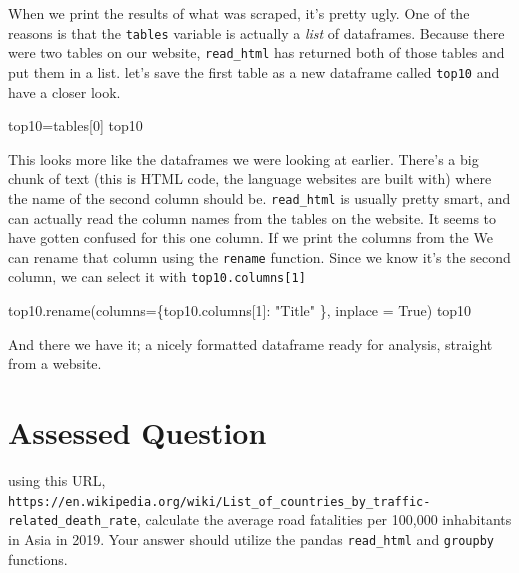 \documentclass[
  letterpaper,
  DIV=11,
  numbers=noendperiod]{scrreprt}
\newenvironment{Shaded}{\begin{snugshade}}{\end{snugshade}}
\newcommand{\DecValTok}[1]{\textcolor[rgb]{0.68,0.00,0.00}{#1}}
\newcommand{\NormalTok}[1]{\textcolor[rgb]{0.00,0.23,0.31}{#1}}
\newcommand{\OperatorTok}[1]{\textcolor[rgb]{0.37,0.37,0.37}{#1}}
\newcommand{\StringTok}[1]{\textcolor[rgb]{0.13,0.47,0.30}{#1}}
\newcommand{\VariableTok}[1]{\textcolor[rgb]{0.07,0.07,0.07}{#1}}
\begin{document}
When we print the results of what was scraped, it's pretty ugly. One of
the reasons is that the \texttt{tables} variable is actually a
\emph{list} of dataframes. Because there were two tables on our website,
\texttt{read\_html} has returned both of those tables and put them in a
list. let's save the first table as a new dataframe called
\texttt{top10} and have a closer look.

\begin{Shaded}
\begin{Highlighting}[]
\NormalTok{top10}\OperatorTok{=}\NormalTok{tables[}\DecValTok{0}\NormalTok{]}
\NormalTok{top10}
\end{Highlighting}
\end{Shaded}

This looks more like the dataframes we were looking at earlier. There's
a big chunk of text (this is HTML code, the language websites are built
with) where the name of the second column should be. \texttt{read\_html}
is usually pretty smart, and can actually read the column names from the
tables on the website. It seems to have gotten confused for this one
column. If we print the columns from the We can rename that column using
the \texttt{rename} function. Since we know it's the second column, we
can select it with \texttt{top10.columns{[}1{]}}

\begin{Shaded}
\begin{Highlighting}[]
\NormalTok{top10.rename(columns}\OperatorTok{=}\NormalTok{\{top10.columns[}\DecValTok{1}\NormalTok{]: }\StringTok{"Title"}\NormalTok{ \}, inplace }\OperatorTok{=} \VariableTok{True}\NormalTok{)}
\NormalTok{top10}
\end{Highlighting}
\end{Shaded}

And there we have it; a nicely formatted dataframe ready for analysis,
straight from a website.


\hypertarget{assessed-question-1}{%
\chapter{Assessed Question}\label{assessed-question-1}}

using this URL,
\texttt{https://en.wikipedia.org/wiki/List\_of\_countries\_by\_traffic-related\_death\_rate},
calculate the average road fatalities per 100,000 inhabitants in Asia in
2019. Your answer should utilize the pandas \texttt{read\_html} and
\texttt{groupby} functions.
\end{document}
